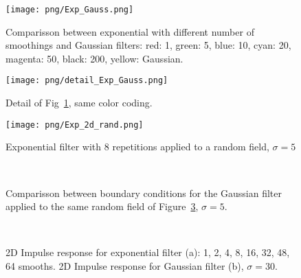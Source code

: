 \documentclass[10pt]{article}
\begin{document}
\begin{figure}[H]
    \centering
    \texttt{[image: png/Exp\_Gauss.png]}
    \caption{Comparisson between exponential with different number of %
             smoothings and Gaussian filters:%
             red: 1, green: 5, blue: 10, cyan: 20, magenta: 50, %
             black: 200, yellow: Gaussian.}
    \label{fig:fig1}
\end{figure}

\begin{figure}[H]
    \centering
    \texttt{[image: png/detail\_Exp\_Gauss.png]}
    \caption{Detail of Fig~\ref{fig:fig1}, same color coding. }
    \label{fig:fig2}
\end{figure}

\begin{figure}[H]
    \centering
    \texttt{[image: png/Exp\_2d\_rand.png]}
    \caption{Exponential filter with 8 repetitions %
            applied to a random field, $\sigma=5$}
    \label{fig:fig3}
\end{figure}


\begin{figure}[ht!]
     \begin{center}
%
        \\ %
%
    \end{center}
    \caption{%
        Comparisson between boundary conditions for the Gaussian
        filter applied to the same random field of Figure~\ref{fig:fig3}, $\sigma=5$.
     }%
   \label{fig:fig4}
\end{figure}


\begin{figure}[ht!]
     \begin{center}
%
        \\ %
%
    \end{center}
    \caption{%
     2D Impulse response for exponential filter (a): 1, 2, 4, 8, 16, 32, 48, 64 smooths. 
      2D Impulse response for Gaussian filter (b), $\sigma=30$.
     }%
   \label{fig:fig5}
\end{figure}
\end{document}

